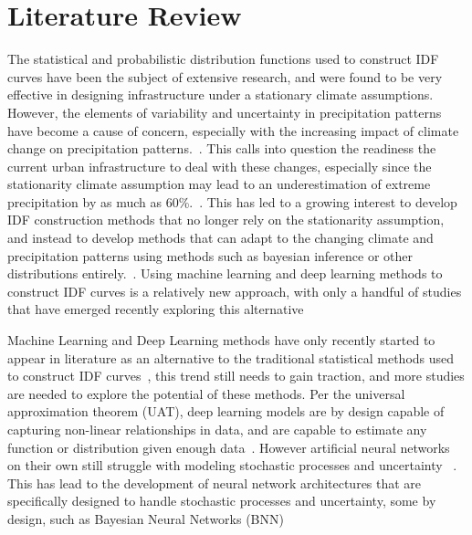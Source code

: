 \section{Literature Review}
The statistical and probabilistic distribution functions used to construct IDF curves have been the subject of extensive research, and were found to be very effective in designing infrastructure under a stationary climate assumptions. However, the elements of variability and uncertainty in precipitation patterns have become a cause of concern, especially with the increasing impact of climate change on precipitation patterns.~\cite{Cheng2014}. This calls into question the readiness the current urban infrastructure to deal with these changes, especially since the stationarity climate assumption may lead to an underestimation of extreme precipitation by as much as 60\%.~\cite{Cheng2014}. This has led to a growing interest to develop IDF construction methods that no longer rely on the stationarity assumption, and instead to develop methods that can adapt to the changing climate and precipitation patterns using methods such as bayesian inference or other distributions entirely.~\cite{Cheng2014}\cite{hess-2020-173}\cite{hess-27-2075-2023}\cite{hess-25-6133-2021}. Using machine learning and deep learning methods to construct IDF curves is a relatively new approach, with only a handful of studies that have emerged recently exploring this alternative~\cite{idfkoya}

\vspace{1em}

Machine Learning and Deep Learning methods have only recently started to appear in literature as an alternative to the traditional statistical methods used to construct IDF curves~\cite{idfkoya}, this trend still needs to gain traction, and more studies are needed to explore the potential of these methods. Per the universal approximation theorem (UAT), deep learning models are by design capable of capturing non-linear relationships in data, and are capable to estimate any function or distribution given enough data~\cite{Goodfellow2016-sect6.4.1}. However artificial neural networks on their own still struggle with modeling stochastic processes and uncertainty ~\cite{}. This has lead to the development of neural network architectures that are specifically designed to handle stochastic processes and uncertainty, some by design, such as Bayesian Neural Networks (BNN)~\cite{} 

\vspace{1em}


